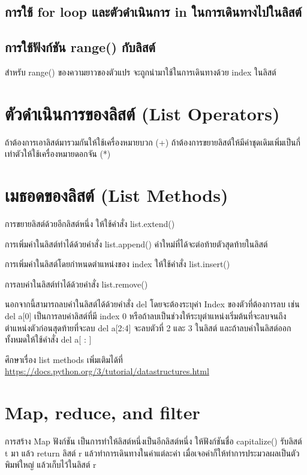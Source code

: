 \subsection{การใช้ for loop และตัวดำเนินการ in ในการเดินทางไปในลิสต์ }
\subsection{การใช้ฟังก์ชัน range() กับลิสต์}

สำหรับ range() ของความยาวของตัวแปร จะถูกนำมาใช้ในการเดินทางด้วย index ในลิสต์

\section{ตัวดำเนินการของลิสต์ (List Operators)}

ถ้าต้องการเอาลิสต์มารวมกันให้ใช้เครื่องหมายบวก (+) ถ้าต้องการขยายลิสต์ให้มีค่าชุดเดิมเพิ่มเป็นกี่เท่าตัวให้ใช้เครื่องหมายดอกจัน (*)

\section{เมธอดของลิสต์ (List Methods)}

การขยายลิสต์ด้วยอีกลิสต์หนึ่ง ให้ใช้คำสั่ง list.extend()

การเพิ่มค่าในลิสต์ทำได้ด้วยคำสั่ง list.append() ค่าใหม่ที่ได้จะต่อท้ายตัวสุดท้ายในลิสต์

การเพิ่มค่าในลิสต์โดยกำหนดตำแหน่งของ  index ให้ใช้คำสั่ง list.insert()

การลบค่าในลิสต์ทำได้ด้วยคำสั่ง list.remove()

นอกจากนี้สามารถลบค่าในลิสต์ได้ด้วยคำสั่ง del โดยจะต้องระบุค่า Index ของตัวที่ต้องการลบ เช่น del a[0] เป็นการลบค่าลิสต์ที่มี index 0 หรือถ้าลบเป็นช่วงให้ระบุตำแหน่งเริ่มต้นที่จะลบจนถึงตำแหน่งตัวก่อนสุดท้ายที่จะลบ del a[2:4] จะลบตัวที่ 2 และ 3 ในลิสต์ และถ้าลบค่าในลิสต์ออกทั้งหมดให้ใช้คำสั่ง del a[ : ]

ศึกษาเรื่อง list methods เพิ่มเติมได้ที่ \url{https://docs.python.org/3/tutorial/datastructures.html}

\section{Map, reduce, and filter}

การสร้าง Map ฟังก์ชัน เป็นการทำให้ลิสต์หนึ่งเป็นอีกลิสต์หนึ่ง ให้ฟังก์ชันชื่อ capitalize() รับลิสต์ t มา แล้ว return ลิสต์ r แล้วทำการเดินทางในค่าแต่ละค่า เมื่อเจอค่าก็ให้ทำการประมวลผลเป็นตัวพิมพ์ใหญ่ แล้วเก็บไว้ในลิสต์ r

